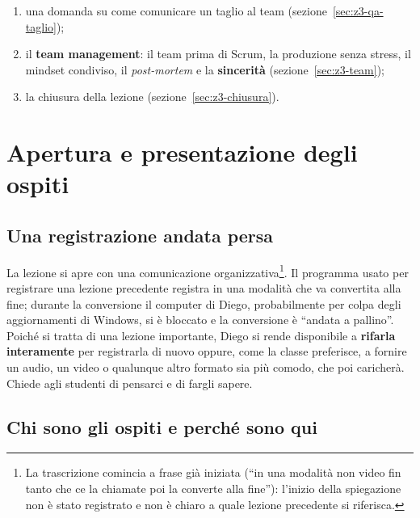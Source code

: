 \begin{enumerate}
        (sezione~\ref{sec:z3-loop}): la stesura del backlog
        (sezione~\ref{sec:z3-backlog}), la selezione dei task
        (sezione~\ref{sec:z3-selezione}), l'implementazione con i suoi
        controlli, i \emph{blocker} e i feedback
        (sezione~\ref{sec:z3-implementazione}), il calcolo della velocity
        (sezione~\ref{sec:z3-calcolo}) e il \emph{tuning} della produzione,
        con il problema del perfezionismo (sezione~\ref{sec:z3-tuning});
  \item una domanda su come comunicare un taglio al team
        (sezione~\ref{sec:z3-qa-taglio});
  \item il \textbf{team management}: il team prima di Scrum, la produzione
        senza stress, il mindset condiviso, il \emph{post-mortem} e la
        \textbf{sincerità} (sezione~\ref{sec:z3-team});
  \item la chiusura della lezione (sezione~\ref{sec:z3-chiusura}).
\end{enumerate}

\section{Apertura e presentazione degli ospiti}
\label{sec:z3-apertura}

\subsection{Una registrazione andata persa}

La lezione si apre con una comunicazione organizzativa\footnote{La
trascrizione comincia a frase già iniziata (``in una modalità non video fin
tanto che ce la chiamate poi la converte alla fine''): l'inizio della
spiegazione non è stato registrato e non è chiaro a quale lezione precedente
si riferisca.}. Il programma usato per registrare una lezione precedente
registra in una modalità che va convertita alla fine; durante la conversione
il computer di Diego, probabilmente per colpa degli aggiornamenti di Windows,
si è bloccato e la conversione è ``andata a pallino''. Poiché si tratta di
una lezione importante, Diego si rende disponibile a \textbf{rifarla
interamente} per registrarla di nuovo oppure, come la classe preferisce, a
fornire un audio, un video o qualunque altro formato sia più comodo, che poi
caricherà. Chiede agli studenti di pensarci e di fargli sapere.

\subsection{Chi sono gli ospiti e perché sono qui}

